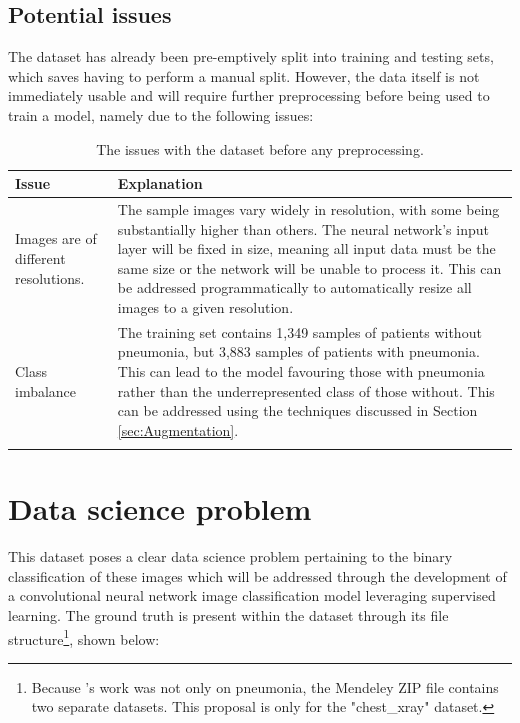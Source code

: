 \documentclass[12pt]{report}
\begin{document}
\subsection{Potential issues}\label{sec:DatasetIssues}
The dataset has already been pre-emptively split into training and testing sets, which saves having to perform a manual split. 
However, the data itself is not immediately usable and will require further preprocessing before being used to train a model, namely due to the 
following issues:

\begin{longtable}{ | p{} | p{} | }
    \hline
    \cellcolor{blue!25} Issue & \cellcolor{blue!25} Explanation \\
    \hline
    Images are of different resolutions. & The sample images vary widely in resolution, with some being substantially higher than others.
    The neural network's input layer will be fixed in size, meaning all input data must be the 
    same size or the network will be unable to process it. This can be addressed programmatically to automatically resize 
    all images to a given resolution.\\
    \hline
    Class imbalance & The training set contains 1,349 samples of patients without pneumonia, but 3,883 samples of patients with pneumonia.
    This can lead to the model favouring those with pneumonia rather than the underrepresented class of those without. This can be addressed 
    using the techniques discussed in Section \ref{sec:Augmentation}.\\
    \hline
    \caption{The issues with the dataset before any preprocessing.}\label{tab:DatasetIssues}
\end{longtable}


\pagebreak 

\section{Data science problem}
This dataset poses a clear data science problem pertaining to the binary classification of these images which will be addressed through the 
development of a convolutional neural network image classification model leveraging supervised learning. 
The ground truth is present within the dataset through its file structure\footnote{Because \textcite
{kermanyIdentifyingMedicalDiagnoses2018}'s work was not only on pneumonia, the Mendeley ZIP file contains two 
separate datasets. This proposal is only for the "chest\_xray" dataset.}, shown below:
\end{document}
